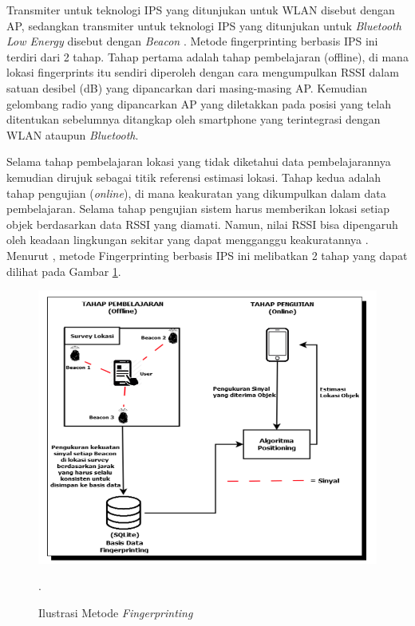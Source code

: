 \par Transmiter untuk teknologi IPS yang ditunjukan untuk WLAN disebut dengan AP, sedangkan transmiter untuk teknologi IPS yang ditunjukan untuk \textit{Bluetooth Low Energy} disebut dengan \textit{Beacon } \cite{puspitasari2020}. Metode fingerprinting berbasis IPS ini terdiri dari 2 tahap. Tahap pertama adalah tahap pembelajaran (offline), di mana lokasi fingerprints itu sendiri diperoleh dengan cara mengumpulkan RSSI dalam satuan desibel (dB) yang dipancarkan dari masing-masing AP. Kemudian gelombang radio yang dipancarkan AP yang diletakkan pada posisi yang telah ditentukan sebelumnya ditangkap oleh smartphone yang terintegrasi dengan WLAN ataupun \textit{Bluetooth}.

\par Selama tahap pembelajaran lokasi yang tidak diketahui data pembelajarannya kemudian dirujuk sebagai titik referensi estimasi lokasi. Tahap kedua adalah tahap pengujian (\textit{online}), di mana keakuratan yang dikumpulkan dalam data pembelajaran. Selama tahap pengujian sistem harus memberikan lokasi setiap objek berdasarkan data RSSI yang diamati. Namun, nilai RSSI bisa dipengaruh oleh keadaan lingkungan sekitar yang dapat mengganggu keakuratannya \citep{subhan2011indoor}. Menurut \citep{yudha2018indoor}, metode Fingerprinting berbasis IPS ini melibatkan 2 tahap yang dapat dilihat pada Gambar \ref{img:fingerprinting}.

\begin{figure}[H]
\centering
{\includegraphics [scale=.5]{gambar/bab2/Fingerprinting}}
\caption{Ilustrasi Metode \textit{Fingerprinting} \citep{yudha2018indoor}}.
\label{img:fingerprinting}
\end{figure}


